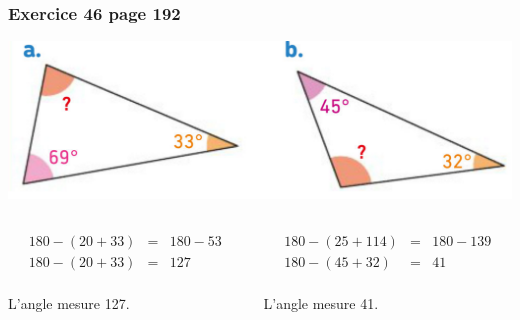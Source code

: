 \documentclass[xcolor={dvipsnames}]{beamer}
\begin{document}
\begin{frame}
	\frametitle{Exercice 46 page 192}
	
	\begin{center}
		\includegraphics[scale=0.25]{../img/exos/45}\pause
	\end{center}	
	
	
	\begin{columns}
		\begin{column}{0.5\textwidth}
			\begin{eqnarray*}
				180 - (20 + 33) &=& 180 - 53 \\
				180 - (20 + 33) &=& 127\\
			\end{eqnarray*}
			
			L'angle mesure 127\degree.\pause
		\end{column}
		
		\begin{column}{0.5\textwidth}
			\begin{eqnarray*}
				180 - (25 + 114) &=& 180 - 139 \\
				180 - (45 + 32) &=& 41\\
			\end{eqnarray*}
			
			L'angle mesure 41\degree.
		\end{column}
		
	\end{columns}
\end{frame}
\end{document}
